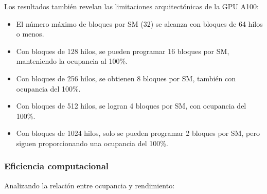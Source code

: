             Los resultados también revelan las limitaciones arquitectónicas de la GPU A100:
            
            \begin{itemize}
            
                \item El número máximo de bloques por SM (32) se alcanza con bloques de 64 hilos o menos.
                
                \item Con bloques de 128 hilos, se pueden programar 16 bloques por SM, manteniendo la ocupancia al 100\%.
                
                \item Con bloques de 256 hilos, se obtienen 8 bloques por SM, también con ocupancia del 100\%.
                
                \item Con bloques de 512 hilos, se logran 4 bloques por SM, con ocupancia del 100\%.
                
                \item Con bloques de 1024 hilos, solo se pueden programar 2 bloques por SM, pero siguen proporcionando una ocupancia del 100\%.
           
            \end{itemize}

        \subsubsection{Eficiencia computacional}
    
            Analizando la relación entre ocupancia y rendimiento:
            
